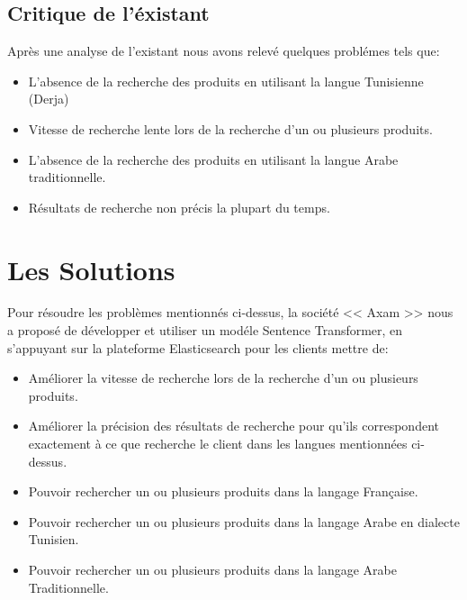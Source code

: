 \subsection{Critique de l'éxistant}
\noindent
Après une analyse de l'existant nous avons relevé quelques problémes tels que:

\renewcommand\labelitemi{$\bullet$}
\begin{itemize}
    \item L'absence de la recherche des produits en utilisant la langue Tunisienne (Derja) 
    \item Vitesse de recherche lente lors de la recherche d'un ou plusieurs produits.
    \item L'absence de la recherche des produits en utilisant la langue Arabe traditionnelle.
    \item Résultats de recherche non précis la plupart du temps.
\end{itemize}

\newpage
\section{Les Solutions}
\noindent
Pour résoudre les problèmes mentionnés ci-dessus, la société << Axam >> nous a proposé de développer et utiliser un modéle Sentence Transformer, en s'appuyant sur la plateforme Elasticsearch pour les clients mettre de:

\renewcommand\labelitemi{$\bullet$}
\begin{itemize}
    \item Améliorer la vitesse de recherche lors de la recherche d’un ou plusieurs produits.

    \item Améliorer la précision des résultats de recherche pour qu'ils correspondent exactement à ce que recherche le client dans les langues mentionnées ci-dessus.

    \item Pouvoir rechercher un ou plusieurs produits dans la langage Française.

    \item Pouvoir rechercher un ou plusieurs produits dans la langage Arabe en dialecte Tunisien.

    \item Pouvoir rechercher un ou plusieurs produits dans la langage Arabe Traditionnelle.
\end{itemize}